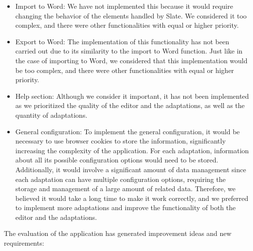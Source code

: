 \begin{itemize}
    \item Import to Word: We have not implemented this because it would require changing the behavior of the elements handled by Slate. We considered it too complex, and there were other functionalities with equal or higher priority.
    \item Export to Word: The implementation of this functionality has not been carried out due to its similarity to the import to Word function. Just like in the case of importing to Word, we considered that this implementation would be too complex, and there were other functionalities with equal or higher priority.
    \item Help section: Although we consider it important, it has not been implemented as we prioritized the quality of the editor and the adaptations, as well as the quantity of adaptations.
    \item General configuration: To implement the general configuration, it would be necessary to use browser cookies to store the information, significantly increasing the complexity of the application. For each adaptation, information about all its possible configuration options would need to be stored. Additionally, it would involve a significant amount of data management since each adaptation can have multiple configuration options, requiring the storage and management of a large amount of related data. Therefore, we believed it would take a long time to make it work correctly, and we preferred to implement more adaptations and improve the functionality of both the editor and the adaptations.
\end{itemize}

The evaluation of the application has generated improvement ideas and new requirements:

